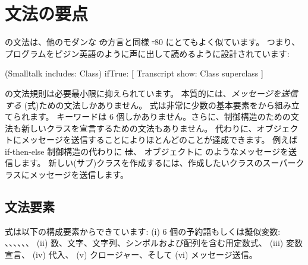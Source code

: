 \documentclass[a4paper,10pt,twoside]{book}
\begin{document}
	\renewcommand{\nnbb}[2]{} %
	\sloppy
\fi
\chapter{文法の要点}



\pharo の文法は、他のモダンな \st の方言と同様 \st-80 にとてもよく似ています。
つまり、プログラムをピジン英語のように声に出して読めるように設計されています:

\begin{code}{}
(Smalltalk includes: Class) ifTrue: [ Transcript show: Class superclass ]
\end{code}

\noindent
\pharo の文法規則は必要最小限に抑えられています。
本質的には、\emph{メッセージを送信する} (\ie 式)ための文法しかありません。
式は非常に少数の基本要素をから組み立てられます。
キーワードは 6 個しかありません。さらに、制御構造のための文法も新しいクラスを宣言するための文法もありません。
代わりに、オブジェクトにメッセージを送信することによりほとんどのことが達成できます。
例えば if-then-else 制御構造の代わりに \st は、 オブジェクトに  のようなメッセージを送信します。
新しい\mbox{(サブ)クラス}を作成するには、作成したいクラスのスーパークラスにメッセージを送信します。

\section{文法要素}

式は以下の構成要素からできています:
(i) 6 個の予約語もしくは擬似変数:
、、、、、、
(ii) 数、文字、文字列、シンボルおよび配列を含む用定数式、
(iii) 変数宣言、
(iv) 代入、
(v) クロージャー、そして
(vi) メッセージ送信。
\end{document}
